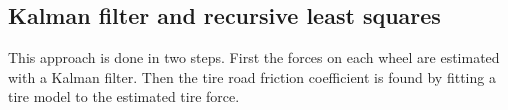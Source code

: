 \subsection{Kalman filter and recursive least squares}
This approach is done in two steps. First the forces on each wheel are estimated with a Kalman filter. Then the tire road friction coefficient is found by fitting a tire model to the estimated tire force.
